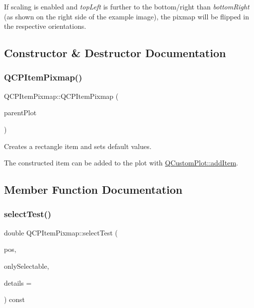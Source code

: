 If scaling is enabled and {\itshape top\+Left} is further to the bottom/right than {\itshape bottom\+Right} (as shown on the right side of the example image), the pixmap will be flipped in the respective orientations. 

\subsection{Constructor \& Destructor Documentation}
\mbox{\label{class_q_c_p_item_pixmap_aa6de42a37261b21a5480e7da122345c3}} 
\subsubsection{\texorpdfstring{Q\+C\+P\+Item\+Pixmap()}{QCPItemPixmap()}}
{\footnotesize\ttfamily Q\+C\+P\+Item\+Pixmap\+::\+Q\+C\+P\+Item\+Pixmap (\begin{DoxyParamCaption}\item[{\mbox{\hyperlink{class_q_custom_plot}{Q\+Custom\+Plot}} $\ast$}]{parent\+Plot }\end{DoxyParamCaption})}

Creates a rectangle item and sets default values.

The constructed item can be added to the plot with \mbox{\hyperlink{class_q_custom_plot_aa500620379262321685cb7a7674cbd2a}{Q\+Custom\+Plot\+::add\+Item}}. 

\subsection{Member Function Documentation}
\mbox{\label{class_q_c_p_item_pixmap_a7583a98ebd3f35d2ac5d6c05fad25a6c}} 
\subsubsection{\texorpdfstring{select\+Test()}{selectTest()}}
{\footnotesize\ttfamily double Q\+C\+P\+Item\+Pixmap\+::select\+Test (\begin{DoxyParamCaption}\item[{const Q\+PointF \&}]{pos,  }\item[{bool}]{only\+Selectable,  }\item[{Q\+Variant $\ast$}]{details = {} }\end{DoxyParamCaption}) const\hspace{0.3cm}{\ttfamily [virtual]}}


